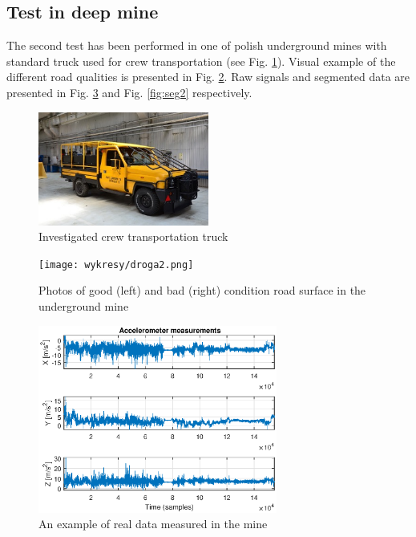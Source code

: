 \documentclass[10pt]{article}
\begin{document}
\subsection{Test in deep mine}

The second test has been performed in one of polish underground mines with standard truck used for crew transportation (see Fig. \ref{fig:truck}). Visual example of the different road qualities is presented in Fig. \ref{fig:droga2}. Raw signals and segmented data are presented in Fig. \ref{fig:raw2} and Fig. \ref{fig:seg2} respectively.

\begin{figure}[ht!]
\centering
\includegraphics[width=0.5\textwidth]{wykresy/truck.png}
\caption{Investigated crew transportation truck}
\label{fig:truck}
\end{figure}

\begin{figure}[ht!]
\centering
\texttt{[image: wykresy/droga2.png]}
\caption{Photos of good (left) and bad (right) condition road surface in the underground mine}
\label{fig:droga2}
\end{figure}

\begin{figure}[ht!]
\centering
\includegraphics[width=0.7\textwidth]{wykresy/raw2.eps}
\caption{An example of real data measured in the mine}
\label{fig:raw2}
\end{figure}
\end{document}

